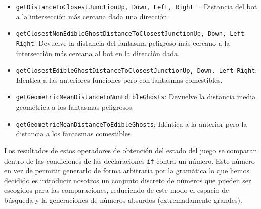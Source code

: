 \begin{itemize}
\item \texttt{getDistanceToClosestJunction{Up, Down, Left, Right}} = Distancia del bot a la intersección más cercana dada una dirección.

\item \texttt{getClosestNonEdibleGhostDistanceToClosestJunction{Up, Down, Left Right}}: Devuelve la distancia del fantasma peligroso más cercano a la intersección más cercana al bot en la dirección dada.

\item \texttt{getClosestEdibleGhostDistanceToClosestJunction{Up, Down, Left Right}}: Identica a las anteriores funciones pero con fantasmas comestibles.

\item \texttt{getGeometricMeanDistanceToNonEdibleGhosts}: Devuelve la distancia media geométrica a los fantasmas peligrosos.

\item \texttt{getGeometricMeanDistanceToEdibleGhosts}: Idéntica a la anterior pero la distancia a los fantasmas comestibles.
\end{itemize}

Los resultados de estos operadores de obtención del estado del juego se comparan dentro de las condiciones de las declaraciones \texttt{if} contra un número. Este número en vez de permitir generarlo de forma arbitraria por la gramática lo que hemos decidido es introducir nosotros un conjunto discreto de números que pueden ser escogidos para las comparaciones, reduciendo de este modo el espacio de búsqueda y la generaciones de números absurdos (extremadamente grandes).

